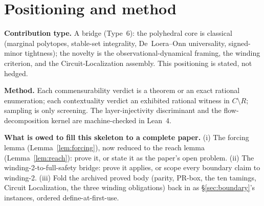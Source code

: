 \section*{Positioning and method}\label{sec:method}

\textbf{Contribution type.} A bridge (Type~6): the polyhedral core is classical
(marginal polytopes, stable-set integrality, De~Loera--Onn universality,
signed-minor tightness); the novelty is the observational-dynamical framing, the
winding criterion, and the Circuit-Localization assembly. This positioning is
stated, not hedged.

\textbf{Method.} Each commensurability verdict is a theorem or an exact rational
enumeration; each contextuality verdict an exhibited rational witness in
$C\setminus R$; sampling is only screening. The layer-injectivity discriminant and
the flow-decomposition kernel are machine-checked in Lean~4.

\textbf{What is owed to fill this skeleton to a complete paper.} (i) The forcing
lemma (Lemma~\ref{lem:forcing}), now reduced to the reach lemma (Lemma~\ref{lem:reach}): prove it, or state it as the paper's open problem.
(ii) The winding-2-to-full-safety bridge: prove it applies, or scope every
boundary claim to winding-2. (iii) Fold the archived proved body
(parity, PR-box, the ten tamings, Circuit Localization, the three winding
obligations) back in as \S\ref{sec:boundary}'s instances, ordered define-at-first-use.
